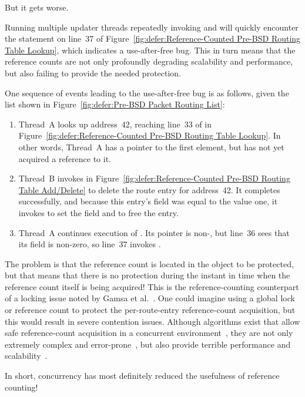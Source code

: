 But it gets worse.

Running multiple updater threads repeatedly invoking
 and  will quickly encounter the
 statement on line~37 of
Figure~\ref{fig:defer:Reference-Counted Pre-BSD Routing Table Lookup},
which indicates a use-after-free bug.
This in turn means that the reference counts are not only profoundly
degrading scalability and performance, but also failing to provide
the needed protection.

One sequence of events leading to the use-after-free bug is as follows,
given the list shown in
Figure~\ref{fig:defer:Pre-BSD Packet Routing List}:

\begin{enumerate}
\item	Thread~A looks up address~42, reaching line~33 of
	 in
	Figure~\ref{fig:defer:Reference-Counted Pre-BSD Routing Table Lookup}.
	In other words, Thread~A has a pointer to the first element,
	but has not yet acquired a reference to it.
\item	Thread~B invokes  in
	Figure~\ref{fig:defer:Reference-Counted Pre-BSD Routing Table Add/Delete}
	to delete the route entry for address~42.
	It completes successfully, and because this entry's 
	field was equal to the value one, it invokes
	 to set the  field and to free the entry.
\item	Thread~A continues execution of .
	Its  pointer is non-, but line~36 sees that
	its  field is non-zero, so line~37 invokes
	.
\end{enumerate}

The problem is that the reference count is located in the object
to be protected, but that means that there is no protection during
the instant in time when the reference count itself is being acquired!
This is the reference-counting counterpart of a locking issue noted
by Gamsa et al.~\cite{Gamsa99}.
One could imagine using a global lock or reference count to protect
the per-route-entry reference-count acquisition, but this would
result in severe contention issues.
Although algorithms exist that allow safe reference-count acquisition
in a concurrent environment~\cite{Valois95a}, they are not only extremely
complex and error-prone~\cite{MagedMichael95a}, but also provide
terrible performance and scalability~\cite{ThomasEHart2007a}.

In short, concurrency has most definitely reduced the usefulness
of reference counting!

